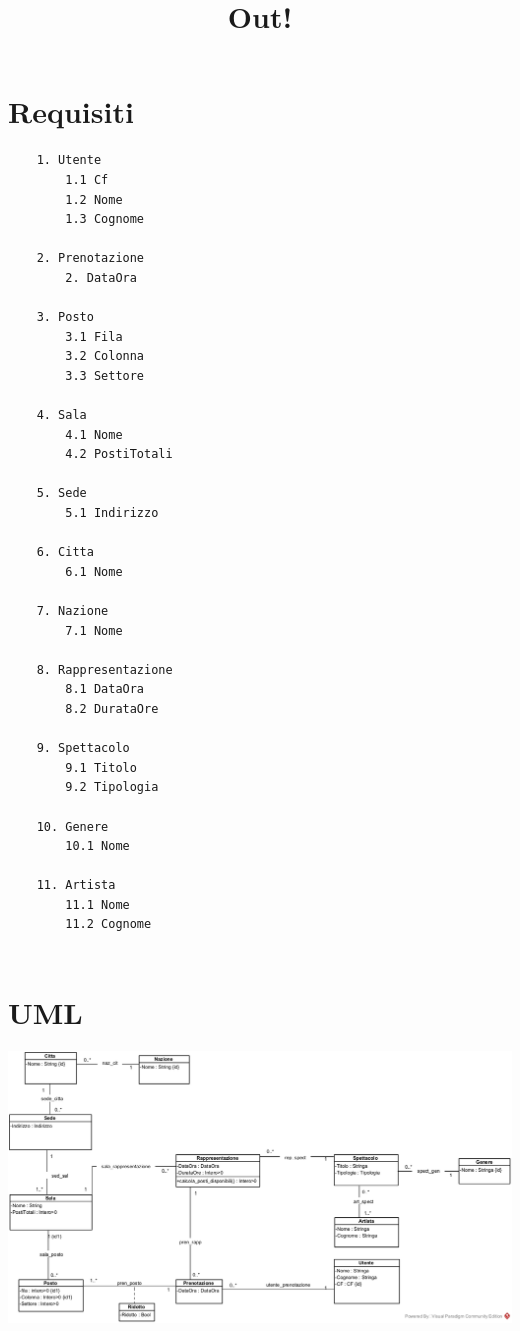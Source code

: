 \documentclass[12pt, letterpaper]{article}
\title{\textbf{Out!}}
\date{}
\begin{document}
\maketitle

\tableofcontents 
\newpage
\section{Requisiti}
\begin{verbatim}
    1. Utente
        1.1 Cf
        1.2 Nome
        1.3 Cognome
    
    2. Prenotazione 
        2. DataOra
    
    3. Posto 
        3.1 Fila
        3.2 Colonna
        3.3 Settore
    
    4. Sala 
        4.1 Nome
        4.2 PostiTotali
    
    5. Sede
        5.1 Indirizzo
    
    6. Citta
        6.1 Nome

    7. Nazione
        7.1 Nome
    
    8. Rappresentazione
        8.1 DataOra
        8.2 DurataOre
    
    9. Spettacolo
        9.1 Titolo
        9.2 Tipologia
        
    10. Genere
        10.1 Nome
    
    11. Artista
        11.1 Nome
        11.2 Cognome


\end{verbatim}
\newpage\section{UML}
\begin{center}
    \includegraphics[width=1\textwidth ]{Images/UML.jpg}
\end{center} \newpage
\end{document}
